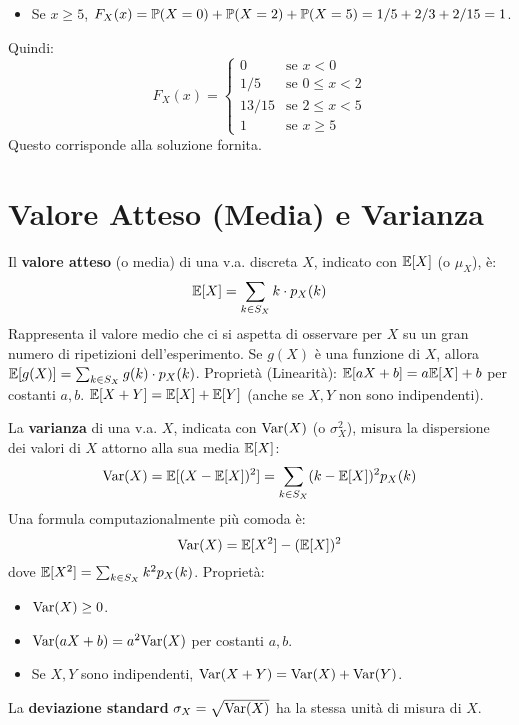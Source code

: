 \documentclass[12pt,a4paper]{article}
\begin{document}
\begin{example}
\begin{example}
\begin{enumerate}
\begin{itemize}
        \item Se $x \ge 5$, $F_X(x) = \mathbb{P}(X=0) + \mathbb{P}(X=2) + \mathbb{P}(X=5) = 1/5 + 2/3 + 2/15 = 1$.
    \end{itemize}
    Quindi:
    \[ F_X(x) = \begin{cases} 0 & \text{se } x < 0 \\ 1/5 & \text{se } 0 \le x < 2 \\ 13/15 & \text{se } 2 \le x < 5 \\ 1 & \text{se } x \ge 5 \end{cases} \]
    Questo corrisponde alla soluzione fornita.
\end{enumerate}
\end{example}

\section{Valore Atteso (Media) e Varianza}
\begin{definition}
Il \textbf{valore atteso} (o media) di una v.a. discreta $X$, indicato con $\mathbb{E}[X]$ (o $\mu_X$), è:
\[ \mathbb{E}[X] = \sum_{k \in S_X} k \cdot p_X(k) \]
Rappresenta il valore medio che ci si aspetta di osservare per $X$ su un gran numero di ripetizioni dell'esperimento.
Se $g(X)$ è una funzione di $X$, allora $\mathbb{E}[g(X)] = \sum_{k \in S_X} g(k) \cdot p_X(k)$.
Proprietà (Linearità): $\mathbb{E}[aX+b] = a\mathbb{E}[X]+b$ per costanti $a,b$.
$\mathbb{E}[X+Y] = \mathbb{E}[X]+\mathbb{E}[Y]$ (anche se $X,Y$ non sono indipendenti).
\end{definition}

\begin{definition}[Varianza]
La \textbf{varianza} di una v.a. $X$, indicata con $\mathrm{Var}(X)$ (o $\sigma_X^2$), misura la dispersione dei valori di $X$ attorno alla sua media $\mathbb{E}[X]$:
\[ \mathrm{Var}(X) = \mathbb{E}[(X - \mathbb{E}[X])^2] = \sum_{k \in S_X} (k - \mathbb{E}[X])^2 p_X(k) \]
Una formula computazionalmente più comoda è:
\[ \mathrm{Var}(X) = \mathbb{E}[X^2] - (\mathbb{E}[X])^2 \]
dove $\mathbb{E}[X^2] = \sum_{k \in S_X} k^2 p_X(k)$.
Proprietà:
\begin{itemize}
    \item $\mathrm{Var}(X) \ge 0$.
    \item $\mathrm{Var}(aX+b) = a^2 \mathrm{Var}(X)$ per costanti $a,b$.
    \item Se $X, Y$ sono indipendenti, $\mathrm{Var}(X+Y) = \mathrm{Var}(X) + \mathrm{Var}(Y)$.
\end{itemize}
La \textbf{deviazione standard} $\sigma_X = \sqrt{\mathrm{Var}(X)}$ ha la stessa unità di misura di $X$.
\end{definition}


\end{example}
\end{document}
